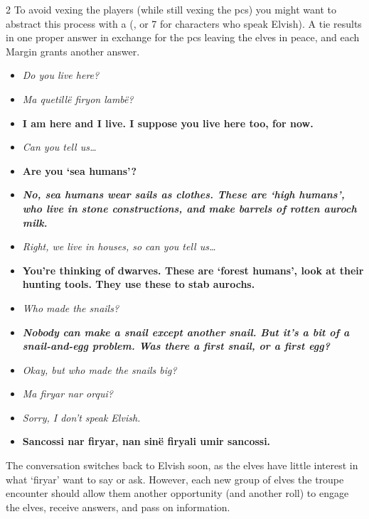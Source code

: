\begin{multicols}{2}
To avoid vexing the players (while still vexing the \glspl{pc}) you might want to abstract this process with a  (\tn[10], or 7 for characters who speak Elvish).
A tie results in one proper answer in exchange for the \glspl{pc} leaving the elves in peace, and each Margin grants another answer.

\medbreak

\begin{itemize}
  \item\it
  Do you live here?
  \item[\adforn{51}]\sl
  Ma quetill\"e firyon lamb\"e?
  \item[\adforn{53}]\bf
  I am here and I live.
  I suppose you live here too, for now.
  \item\it
  Can you tell us\ldots
  \item[\adforn{53}]\bf
  Are you `sea humans'?
  \item[\adforn{52}]\bf\sl
  No, sea humans wear sails as clothes. 
  These are `high humans', who live in stone constructions, and make barrels of rotten auroch milk.
  \item\it
  Right, we live in houses, so can you tell us\ldots
  \item[\adforn{53}]\bf
  You're thinking of dwarves.
  These are `forest humans', look at their hunting tools.
  They use these to stab aurochs.
  \item\it
  Who made the snails?
  \item[\adforn{52}]\bf\sl
  Nobody can make a snail except another snail.
  But it's a bit of a snail-and-egg problem.
  Was there a first snail, or a first egg?
  \item\it
  Okay, but who made the snails \emph{big}?
  \item[\adforn{51}]\sl
  Ma firyar nar orqui?
  \item\it
  Sorry, I don't speak Elvish.
  \item[\adforn{53}]\bf
  Sancossi nar firyar, nan sin\"e firyali umir sancossi.
\end{itemize}

The conversation switches back to Elvish soon, as the elves have little
interest in what `firyar' want to say or ask.  However, each new group of elves
the troupe encounter should allow them another opportunity (and another roll)
to engage the elves, receive answers, and pass on information.


\showStdSpells


\end{multicols}

